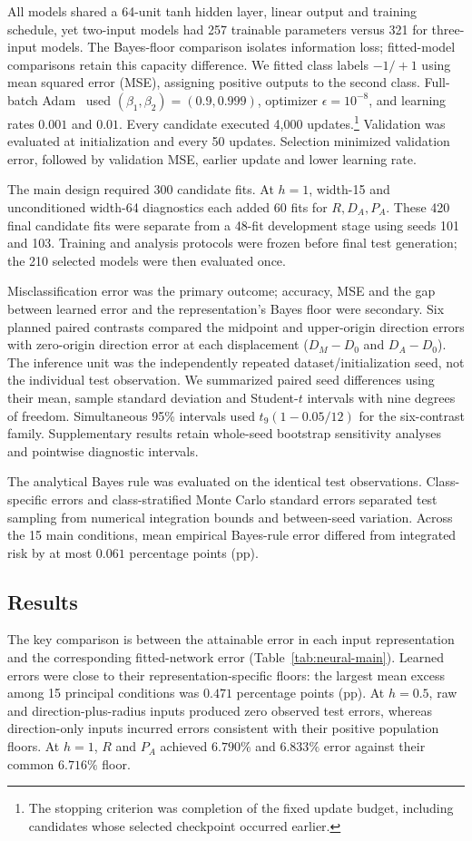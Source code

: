 {All models shared a 64-unit tanh hidden layer, linear output and training schedule, yet two-input models had 257 trainable parameters versus 321 for three-input models. The Bayes-floor comparison isolates information loss; fitted-model comparisons retain this capacity difference. We fitted class labels $-1/+1$ using mean squared error (MSE), assigning positive outputs to the second class. Full-batch Adam~\citep{Kingma2015} used $(\beta_1,\beta_2)=(0.9,0.999)$, optimizer $\epsilon=10^{-8}$, and learning rates $0.001$ and $0.01$. Every candidate executed 4,000 updates.\footnote{The stopping criterion was completion of the fixed update budget, including candidates whose selected checkpoint occurred earlier.} Validation was evaluated at initialization and every 50 updates. Selection minimized validation error, followed by validation MSE, earlier update and lower learning rate.

The main design required 300 candidate fits. At $h=1$, width-15 and unconditioned width-64 diagnostics each added 60 fits for $R,D_A,P_A$. These 420 final candidate fits were separate from a 48-fit development stage using seeds 101 and 103. Training and analysis protocols were frozen before final test generation; the 210 selected models were then evaluated once. 

Misclassification error was the primary outcome; accuracy, MSE and the gap between learned error and the representation's Bayes floor were secondary. Six planned paired contrasts compared the midpoint and upper-origin direction errors with zero-origin direction error at each displacement ($D_M-D_0$ and $D_A-D_0$). The inference unit was the independently repeated dataset/initialization seed, not the individual test observation. We summarized paired seed differences using their mean, sample standard deviation and Student-$t$ intervals with nine degrees of freedom. Simultaneous 95\% intervals used $t_9(1-0.05/12)$ for the six-contrast family. Supplementary results retain whole-seed bootstrap sensitivity analyses and pointwise diagnostic intervals.

The analytical Bayes rule was evaluated on the identical test observations. Class-specific errors and class-stratified Monte Carlo standard errors separated test sampling from numerical integration bounds and between-seed variation. Across the 15 main conditions, mean empirical Bayes-rule error differed from integrated risk by at most $0.061$ percentage points (pp).

\subsection{Results}
The key comparison is between the attainable error in each input representation and the corresponding fitted-network error (Table~\ref{tab:neural-main}). Learned errors were close to their representation-specific floors: the largest mean excess among 15 principal conditions was $0.471$ percentage points (pp). At $h=0.5$, raw and direction-plus-radius inputs produced zero observed test errors, whereas direction-only inputs incurred errors consistent with their positive population floors. At $h=1$, $R$ and $P_A$ achieved $6.790\%$ and $6.833\%$ error against their common $6.716\%$ floor.

}
